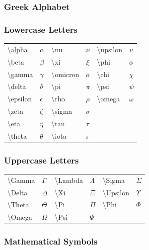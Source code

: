 \subsubsection{Greek Alphabet}
\subsubsection{Lowercase Letters}
\begin{tabular}{ll | ll | ll}
\textbackslash alpha & $\alpha$ & \textbackslash nu & $\nu$ & \textbackslash upsilon & $\upsilon$ \\
\textbackslash beta & $\beta$ & \textbackslash xi & $\xi$ & \textbackslash phi & $\phi$ \\
\textbackslash gamma & $\gamma$ & \textbackslash omicron & $o$ & \textbackslash chi & $\chi$ \\
\textbackslash delta & $\delta$ & \textbackslash pi & $\pi$ & \textbackslash psi & $\psi$ \\
\textbackslash epsilon & $\epsilon$ & \textbackslash rho & $\rho$ & \textbackslash omega & $\omega$ \\
\textbackslash zeta & $\zeta$ & \textbackslash sigma & $\sigma$ &  &  \\
\textbackslash eta & $\eta$ & \textbackslash tau & $\tau$ &  &  \\
\textbackslash theta & $\theta$ & \textbackslash iota & $\iota$ &  &  \\
\end{tabular}

\subsubsection{Uppercase Letters}
\begin{tabular}{ll | ll | ll}
\textbackslash Gamma & $\Gamma$ & \textbackslash Lambda & $\Lambda$ & \textbackslash Sigma & $\Sigma$ \\
\textbackslash Delta & $\Delta$ & \textbackslash Xi & $\Xi$ & \textbackslash Upsilon & $\Upsilon$ \\
\textbackslash Theta & $\Theta$ & \textbackslash Pi & $\Pi$ & \textbackslash Phi & $\Phi$ \\
\textbackslash Omega & $\Omega$ & \textbackslash Psi & $\Psi$ &  &  \\
\end{tabular}

\subsubsection{Mathematical Symbols}
